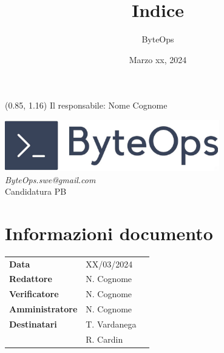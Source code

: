 \documentclass{article}
\title{\textbf{\fontsize{28}{6}\selectfont Indice}}
\author{\fontsize{14}{6}\selectfont ByteOps}
\date{Marzo xx, 2024}
\begin{document}
\begin{textblock*}{\textwidth}(0.85\textwidth, 1.16\textheight)
    Il responsabile: Nome Cognome
\end{textblock*}

\pagestyle{fancy}
\begin{center}
\includegraphics[width = 0.7\textwidth]{Images/logo.png} \\
\vspace{0.2cm}
\textcolor[RGB]{60, 60, 60}{\textit{ByteOps.swe@gmail.com}} \\
\vspace{1cm}
\fontsize{16}{6}\selectfont Candidatura PB \\
\vspace{0.5cm}
\end{center}

\section*{Informazioni documento}
\def\arraystretch{1.2}
\begin{tabular}{>{\raggedleft\arraybackslash}p{}|>{\raggedright\arraybackslash}p{}c}
\hline
\addlinespace
\textbf{Data} & XX/03/2024 \vspace{10pt} \\
\textbf{Redattore} & N. Cognome \vspace{10pt} \\
\textbf{Verificatore} & N. Cognome \vspace{10pt} \\
\textbf{Amministratore} & N. Cognome \vspace{10pt} \\
\textbf{Destinatari} & T. Vardanega \\ & R. Cardin \vspace{10pt} \\
\end{tabular}
\pagebreak 

\maketitle
\thispagestyle{fancy}
{
    \hypersetup{linkcolor=black}
    \tableofcontents
}
\pagebreak
\end{document}
